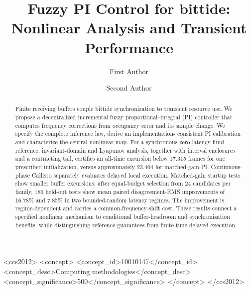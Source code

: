 \documentclass[sigconf]{acmart}
\begin{document}
\title[Fuzzy PI Control for bittide]{Fuzzy PI Control for bittide: Nonlinear Analysis and Transient Performance}

\author{First Author}

\author{Second Author}

\renewcommand{\shortauthors}{First Author and Second Author}

\begin{abstract}
Finite receiving buffers couple bittide synchronization to transient
resource use. We propose a decentralized incremental fuzzy
proportional--integral (PI) controller
that computes frequency corrections from occupancy error and its sample
change. We specify the complete inference law, derive an implementation-
consistent PI calibration and characterize the central nonlinear map.
For a synchronous zero-latency fluid reference, invariant-domain and
Lyapunov analysis, together with interval enclosures and a contracting
tail, certifies an all-time excursion below 17.315 frames for one
prescribed initialization, versus approximately 23.404 for matched-gain
PI. Continuous-phase Callisto separately evaluates delayed local
execution. Matched-gain startup tests show smaller buffer excursions;
after equal-budget selection from 24 candidates per family, 186 held-out
tests show mean paired disagreement-RMS improvements of 16.78\% and
7.85\% in two bounded-random latency regimes. The improvement is
regime-dependent and carries a common-frequency-shift cost. These
results connect a specified nonlinear mechanism to conditional
buffer-headroom and synchronization benefits, while distinguishing
reference guarantees from finite-time delayed execution.
\end{abstract}


\begin{CCSXML}
<ccs2012>
 <concept>
  <concept_id>10010147</concept_id>
  <concept_desc>Computing methodologies</concept_desc>
  <concept_significance>500</concept_significance>
 </concept>
</ccs2012>
\end{CCSXML}

\maketitle
\end{document}
